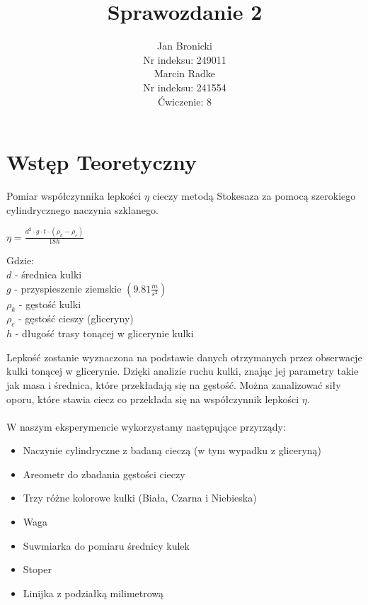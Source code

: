 \documentclass{article}
\title{Sprawozdanie 2}
\author{Jan Bronicki \\
Nr indeksu: 249011\\
Marcin Radke\\
Nr indeksu: 241554\\
Ćwiczenie: 8}
\date{}
\begin{document}
\maketitle
\section{Wstęp Teoretyczny}
\par Pomiar współczynnika lepkości $\eta$ cieczy metodą Stokesaza za pomocą 
szerokiego cylindrycznego 
naczynia szklanego. \\
\begin{center}
    $
    \eta=\frac{d^{2}\cdot g\cdot t\cdot (\rho_{k}-\rho_{c})}{18h}
    $
    \begin{flushleft}
        Gdzie:\\
        $d$ - średnica kulki\\
        $g$ - przyspieszenie ziemskie $(9.81\frac{m}{s^{2}})$\\
        $\rho_{k}$ - gęstość kulki\\
        $\rho_{c}$ - gęstość cieszy (gliceryny)\\
        $h$ - długość trasy tonącej w glicerynie kulki
    \end{flushleft}
\end{center}
\par Lepkość zostanie wyznaczona na podstawie danych otrzymanych przez obserwacje kulki 
tonącej w glicerynie. Dzięki analizie ruchu kulki, znając jej parametry takie 
jak masa i średnica, które przekładają się na gęstość. Można zanalizować siły oporu,
które stawia ciecz co przekłada się na współczynnik lepkości $\eta$.\\ \\
W naszym eksperymencie wykorzystamy następujące przyrządy:\\
\begin{itemize}
    \item Naczynie cylindryczne z badaną cieczą (w tym wypadku z gliceryną)
    \item Areometr do zbadania gęstości cieczy
    \item Trzy różne kolorowe kulki (Biała, Czarna i Niebieska)
    \item Waga
    \item Suwmiarka do pomiaru średnicy kulek
    \item Stoper
    \item Linijka z podziałką milimetrową
\end{itemize}
\newpage
\end{document}
